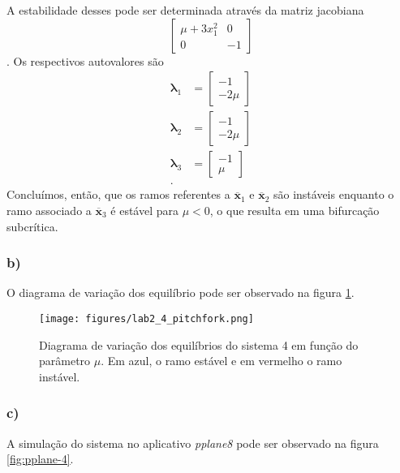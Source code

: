 \documentclass[a4paper]{report}
\begin{document}
A estabilidade desses pode ser determinada através da matriz jacobiana \[
    \begin{bmatrix} \mu+3x_1^2 & 0 \\ 0 & -1 \end{bmatrix} 
\]. Os respectivos autovalores são
\begin{align*}
    \bm{\lambda}_1 &= \begin{bmatrix}   -1 \\ -2\mu \end{bmatrix} \\
    \bm{\lambda}_2 &= \begin{bmatrix}   -1 \\ -2\mu \end{bmatrix} \\
    \bm{\lambda}_3 &= \begin{bmatrix}   -1 \\ \mu \end{bmatrix} \\
.\end{align*}
Concluímos, então, que os ramos referentes a $\bm{\overline{x}}_1$ e $\bm{\overline{x}}_2$ são instáveis enquanto o ramo associado a $\bm{\overline{x}}_3$ é estável para $\mu<0$, o que resulta em uma bifurcação subcrítica.

\subsubsection*{b)}

O diagrama de variação dos equilíbrio pode ser observado na figura \ref{fig:figures-lab2_4_pitchfork-png}.

\begin{figure}[H]
    \centering
    \texttt{[image: figures/lab2\_4\_pitchfork.png]}
    \caption{Diagrama de variação dos equilíbrios do sistema 4 em função do parâmetro $\mu$. Em azul, o ramo estável e em vermelho o ramo instável.}
    \label{fig:figures-lab2_4_pitchfork-png}
\end{figure}

\subsubsection*{c)}

A simulação do sistema no aplicativo \emph{pplane8} pode ser observado na figura \ref{fig:pplane-4}.
\end{document}
